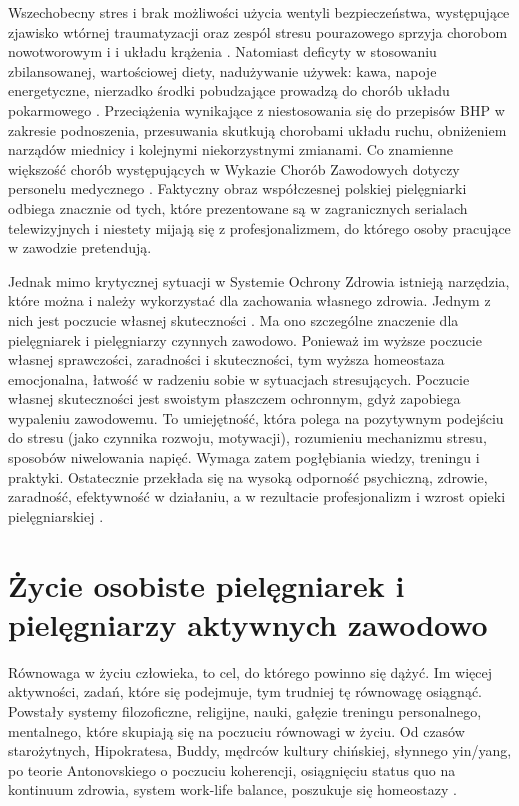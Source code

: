 \documentclass[a4paper,12pt,twoside,openany]{report}
\begin{document}
Wszechobecny stres i brak możliwości użycia wentyli bezpieczeństwa, występujące zjawisko wtórnej traumatyzacji oraz zespól stresu pourazowego sprzyja chorobom nowotworowym i i układu krążenia \cite{skutki}. Natomiast deficyty w stosowaniu zbilansowanej, wartościowej diety, nadużywanie używek: kawa, napoje energetyczne, nierzadko środki pobudzające prowadzą do chorób układu pokarmowego \cite{p.p}. Przeciążenia wynikające z niestosowania się do przepisów BHP w zakresie podnoszenia, przesuwania skutkują chorobami układu ruchu, obniżeniem narządów miednicy i kolejnymi niekorzystnymi zmianami. Co znamienne większość chorób występujących w Wykazie Chorób Zawodowych dotyczy personelu medycznego \cite{wykaz}. Faktyczny obraz współczesnej polskiej pielęgniarki odbiega znacznie od tych, które prezentowane są w zagranicznych serialach telewizyjnych i niestety mijają się z profesjonalizmem, do którego osoby pracujące w zawodzie pretendują.

Jednak mimo krytycznej sytuacji w Systemie Ochrony Zdrowia istnieją narzędzia, które można i należy wykorzystać dla zachowania własnego zdrowia. Jednym z nich jest poczucie własnej skuteczności \cite{skuteczność}. Ma ono szczególne znaczenie dla pielęgniarek i pielęgniarzy czynnych zawodowo. Ponieważ im wyższe poczucie własnej sprawczości, zaradności i skuteczności, tym wyższa homeostaza emocjonalna, łatwość w radzeniu sobie w sytuacjach stresujących\cite{salutogeneza}. Poczucie własnej skuteczności jest swoistym płaszczem ochronnym, gdyż zapobiega wypaleniu zawodowemu. To umiejętność, która polega na pozytywnym podejściu do stresu (jako czynnika rozwoju, motywacji), rozumieniu mechanizmu stresu, sposobów niwelowania napięć. Wymaga zatem pogłębiania wiedzy, treningu i praktyki. Ostatecznie przekłada się na wysoką odporność psychiczną, zdrowie, zaradność, efektywność w działaniu, a w rezultacie profesjonalizm i wzrost opieki pielęgniarskiej \cite{stres}.

\section{Życie osobiste pielęgniarek i pielęgniarzy \newline aktywnych zawodowo}
\label{sectionZycieOsobiste}
Równowaga w życiu człowieka, to cel, do którego powinno się dążyć. Im więcej aktywności, zadań, które się podejmuje, tym trudniej tę równowagę osiągnąć. Powstały systemy filozoficzne, religijne, nauki, gałęzie treningu personalnego, mentalnego, które skupiają się na poczuciu równowagi w życiu. Od czasów starożytnych, Hipokratesa, Buddy, mędrców kultury chińskiej, słynnego yin/yang, po teorie Antonovskiego o poczuciu koherencji, osiągnięciu status quo na kontinuum zdrowia, system work-life balance, poszukuje się homeostazy \cite{salutogeneza}.
\end{document}
